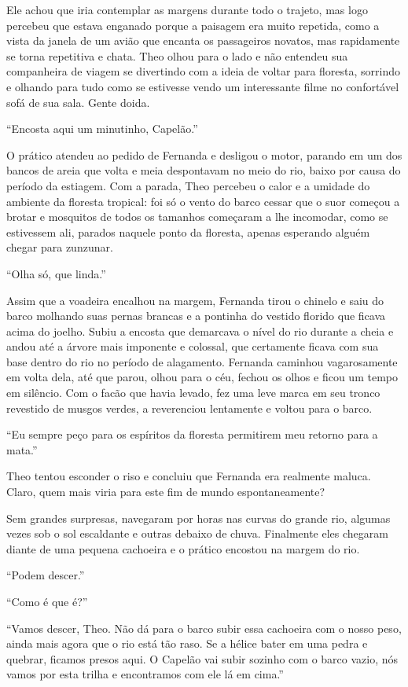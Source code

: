 Ele achou que iria contemplar as margens durante todo o trajeto, mas
logo percebeu que estava enganado porque a paisagem era muito repetida,
como a vista da janela de um avião que encanta os passageiros novatos,
mas rapidamente se torna repetitiva e chata. Theo olhou para o lado e
não entendeu sua companheira de viagem se divertindo com a ideia de
voltar para floresta, sorrindo e olhando para tudo como se estivesse
vendo um interessante filme no confortável sofá de sua sala. Gente
doida.

``Encosta aqui um minutinho, Capelão.''

O prático atendeu ao pedido de
Fernanda e desligou o motor, parando em um dos bancos de areia que volta
e meia despontavam no meio do rio, baixo por causa do período da
estiagem. Com a parada, Theo percebeu o calor e a umidade do ambiente da
floresta tropical: foi só o vento do barco cessar que o suor começou a
brotar e mosquitos de todos os tamanhos começaram a lhe incomodar, como
se estivessem ali, parados naquele ponto da floresta, apenas esperando
alguém chegar para zunzunar.

``Olha só, que linda.''

Assim que a voadeira encalhou na margem, Fernanda tirou o chinelo e saiu
do barco molhando suas pernas brancas e a pontinha do vestido florido
que ficava acima do joelho. Subiu a encosta que demarcava o nível do rio
durante a cheia e andou até a árvore mais imponente e colossal, que
certamente ficava com sua base dentro do rio no período de alagamento.
Fernanda caminhou vagarosamente em volta dela, até que parou, olhou para
o céu, fechou os olhos e ficou um tempo em silêncio. Com o facão que
havia levado, fez uma leve marca em seu tronco revestido de musgos
verdes, a reverenciou lentamente e voltou para o barco.

``Eu sempre peço para os espíritos da floresta permitirem meu retorno
para a mata.''

Theo tentou esconder o riso e concluiu que Fernanda era realmente
maluca. Claro, quem mais viria para este fim de mundo espontaneamente?

Sem grandes surpresas, navegaram por horas nas curvas do grande rio,
algumas vezes sob o sol escaldante e outras debaixo de chuva. Finalmente
eles chegaram diante de uma pequena cachoeira e o prático encostou na
margem do rio.

``Podem descer.''

``Como é que é?''

``Vamos descer, Theo. Não dá para o barco subir essa cachoeira com o
nosso peso, ainda mais agora que o rio está tão raso. Se a hélice bater
em uma pedra e quebrar, ficamos presos aqui. O Capelão vai subir sozinho
com o barco vazio, nós vamos por esta trilha e encontramos com ele lá em
cima.''

